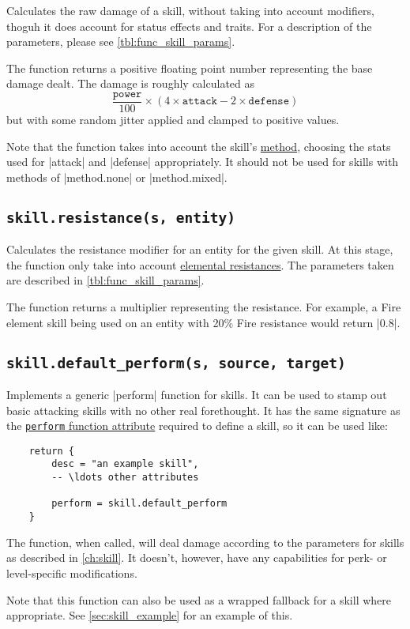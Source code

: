 Calculates the raw damage of a skill,
without taking into account modifiers,
thoguh it does account for status effects and traits.
For a description of the parameters, please see \autoref{tbl:func_skill_params}.

The function returns a positive floating point number
representing the base damage dealt. The damage is roughly calculated as
\[ \frac{\texttt{power}}{100}\times(4\times\texttt{attack} - 2\times\texttt{defense}) \]
but with some random jitter applied and clamped to positive values.

Note that the function takes into account the skill's
\hyperref[tbl:opt_method_spread]{method},
choosing the stats used for |attack| and |defense| appropriately.
It should not be used for skills with methods of |method.none| or |method.mixed|.

\subsection{\lstinline{skill.resistance(s, entity)}}
\label{sec:func_skill_resistance}

Calculates the resistance modifier for an entity for the given skill.
At this stage, the function only take into account
\hyperref[ch:elements]{elemental resistances}.
The parameters taken are described in \autoref{tbl:func_skill_params}.

The function returns a multiplier representing the resistance.
For example, a Fire element skill being used on
an entity with 20\% Fire resistance would return |0.8|.


\subsection{\lstinline{skill.default_perform(s, source, target)}}
\label{sec:func_skill_defaultperform}

Implements a generic |perform| function for skills.
It can be used to stamp out basic attacking skills with no other real forethought.
It has the same signature as the
\hyperref[sec:skill_func]{\lstinline{perform} function attribute}
required to define a skill, so it can be used like:
\begin{lstlisting}
    return {
        desc = "an example skill",
        -- \ldots other attributes

        perform = skill.default_perform
    }
\end{lstlisting}

The function, when called, will deal damage
according to the parameters for skills as described in \autoref{ch:skill}.
It doesn't, however, have any capabilities for perk- or level-specific modifications.

Note that this function can also be used as
a wrapped fallback for a skill where appropriate.
See \autoref{sec:skill_example} for an example of this.
